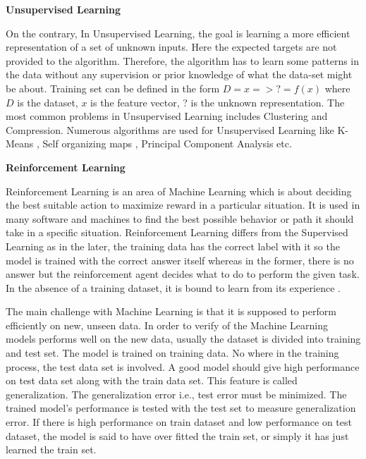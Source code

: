 \noindent \textbf{Unsupervised Learning}
\newline

\noindent On the contrary, In Unsupervised Learning, the goal is learning a more efficient representation of a set of unknown inputs. Here the expected targets are not
provided to the algorithm. Therefore, the algorithm has to learn some patterns in the data without any supervision or prior knowledge of what the data-set might be about.  Training set can be defined in the form \( D = {x} => ? = f(x) \) where \(D\) is the dataset, \(x\) is the feature vector, ? is the unknown representation. The most common problems in Unsupervised Learning includes Clustering and Compression. Numerous algorithms are used for Unsupervised Learning like K-Means \cite{yadav2013review}, Self organizing maps \cite{kohonen1990self}, Principal Component Analysis \cite{jolliffe2005principal} etc.
\newline

\noindent \textbf{Reinforcement Learning}
\newline

\noindent Reinforcement Learning is an area of Machine Learning which is about deciding the best suitable action to maximize reward in a particular situation. It is used in many software and machines to find the best possible behavior or path it should take in a specific situation. Reinforcement Learning differs from the Supervised Learning as in the later, the training data has the correct label with it so the model is trained with the correct answer itself whereas in the former, there is no answer but the reinforcement agent decides what to do to perform the given task. In the absence of a training dataset, it is bound to learn from its experience \cite{geeksforgeeks_2020}.




The main challenge with Machine Learning is that it is supposed to perform efficiently on new, unseen data. In order to verify of the Machine Learning models performs well on the new data, usually the dataset is divided into training and test set. The model is trained on training data. No where in the training process, the test data set is involved. A good model should give high performance on test data set along with the train data set. This feature is called generalization. The generalization error i.e., test error must be minimized. The trained model's performance is tested with the
test set to measure generalization error. If there is high performance on train dataset and low performance on test dataset, the model is said to have over fitted the train set, or simply it has just learned the train set.

